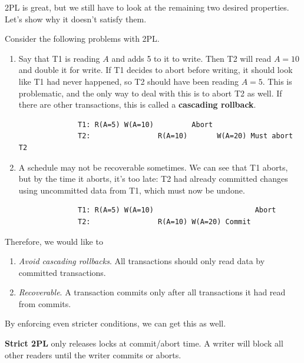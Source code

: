 \documentclass{article}
\begin{document}
      2PL is great, but we still have to look at the remaining two desired properties. Let's show why it doesn't satisfy them. 

      \begin{example}
        Consider the following problems with 2PL.  
        \begin{enumerate}
          \item Say that T1 is reading $A$ and adds 5 to it to write. Then T2 will read $A=10$ and double it for write. If T1 decides to abort before writing, it should look like T1 had never happened, so T2 should have been reading $A=5$. This is problematic, and the only way to deal with this is to abort T2 as well. If there are other transactions, this is called a \textbf{cascading rollback}. 
            \begin{lstlisting}
              T1: R(A=5) W(A=10)         Abort 
              T2:                R(A=10)       W(A=20) Must abort T2
            \end{lstlisting}

          \item A schedule may not be recoverable sometimes. We can see that T1 aborts, but by the time it aborts, it's too late: T2 had already committed changes using uncommitted data from T1, which must now be undone. 
            \begin{lstlisting}
              T1: R(A=5) W(A=10)                        Abort
              T2:                R(A=10) W(A=20) Commit
            \end{lstlisting}
        \end{enumerate}
      \end{example}

      Therefore, we would like to 
      \begin{enumerate}
        \item \textit{Avoid cascading rollbacks}. All transactions should only read data by committed transactions. 
        \item \textit{Recoverable}. A transaction commits only after all transactions it had read from commits. 
      \end{enumerate} 
      By enforcing even stricter conditions, we can get this as well. 

      \begin{definition}[Strict 2PL]
        \textbf{Strict 2PL} only releases locks at commit/abort time. A writer will block all other readers until the writer commits or aborts.
      \end{definition}
\end{document}
